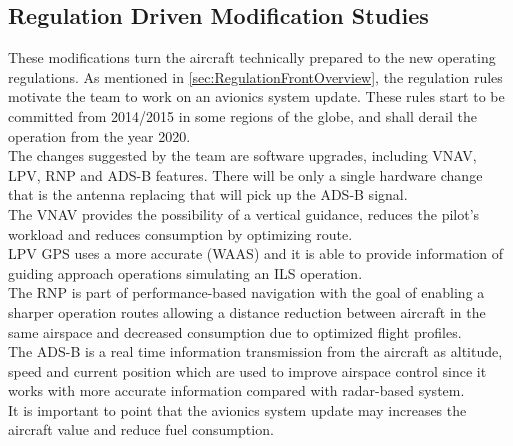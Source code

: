 \subsection{Regulation Driven Modification Studies}
These modifications turn the aircraft technically prepared to the new operating regulations. As mentioned in \ref{sec:RegulationFrontOverview}, the regulation rules motivate the team to work on an avionics system update. These rules start to be committed from 2014/2015 in some regions of the globe, and shall derail the operation from the year 2020.
\\The changes suggested by the team are software upgrades, including VNAV, LPV, RNP and ADS-B features. There will be only a single hardware change that is the antenna replacing that will pick up the ADS-B signal.
\\The VNAV provides the possibility of a vertical guidance, reduces the pilot's workload and reduces consumption by optimizing route.
\\LPV GPS uses a more accurate (WAAS) and it is able to provide information of guiding approach operations simulating an ILS operation.
\\The RNP is part of performance-based navigation with the goal of enabling a sharper operation routes allowing a distance reduction between aircraft in the same airspace and decreased consumption due to optimized flight profiles.
\\The ADS-B is a real time information transmission from the aircraft as altitude, speed and current position which are used to improve airspace control since it works with more accurate information compared with radar-based system.
\\It is important to point that the avionics system update may increases the aircraft value and reduce fuel consumption.